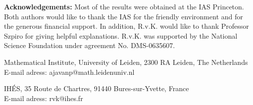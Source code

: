 \documentclass[11pt]{article}
\numberwithin{equation}{section}
\begin{document}
\small
{\bf Acknowledgements:}  
Most of the results were obtained at the IAS Princeton. Both authors would like to thank the IAS for the friendly environment and for the generous financial support. 
In addition, R.v.K. would like to thank Professor Szpiro for giving helpful explanations. R.v.K. was supported 
by the
National Science Foundation under agreement No. DMS-0635607.








\vspace{0.5cm}

\noindent Mathematical Institute, University of Leiden,  2300 RA Leiden, The Netherlands\\
E-mail adress: {\sf ajavanp@math.leidenuniv.nl}

\vspace{0.5cm}

\noindent IH\'ES, 35 Route de Chartres, 91440 Bures-sur-Yvette, France\\
E-mail adress: {\sf rvk@ihes.fr}
\end{document}
